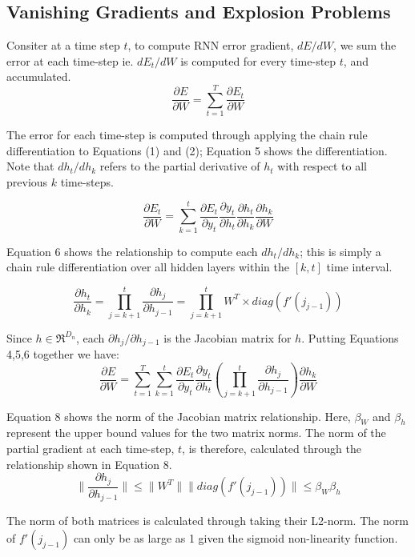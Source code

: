 \documentclass{article}
\begin{document}
\begin{appendices}
\section{Vanishing Gradients and Explosion Problems}
\label{sec:van}

	Consiter at a time step \(t\), to compute RNN error gradient, \(dE/dW\), we sum the error at each time-step ie. \(dE_t/dW\) is computed for every time-step \(t\), and accumulated.
	\[\frac{\partial E}{\partial W} = \sum_{t=1}^{T} \frac{\partial E_t}{\partial W} \tag{4}\]
	
	The error for each time-step is computed through applying the chain rule differentiation to Equations (1) and (2); Equation 5 shows the differentiation. Note that \(dh_t/dh_k\) refers to the partial derivative of \(h_t\) with respect to all previous \(k\) time-steps.
	
	\[
		\frac{\partial E_t}{\partial W} = \sum_{k=1}^{t} \frac{\partial E_t}{\partial y_t} \frac{\partial y_t}{\partial h_t} \frac{\partial h_t}{\partial h_k} \frac{\partial h_k}{\partial W}
		\tag{5}
	\]
	
	Equation 6 shows the relationship to compute each \(dh_t/dh_k\); this is simply a chain rule differentiation over all hidden layers within the \([k, t]\) time interval.
	
	\[
		\frac{\partial h_t}{\partial h_k} = \prod_{j=k+1}^{t} \frac{\partial h_j}{\partial h_{j-1}} = \prod_{j=k+1}^{t} W^T \times diag(f'(j_{j-1}))
		\tag{6}
	\]
	
	Since \(h \in \Re^{D_n} \), each \(\partial h_j/\partial h_{j-1} \) is the Jacobian matrix for \(h\). Putting Equations 4,5,6 together we have:
	\[
		\frac{\partial E}{\partial W} = \sum_{t=1}^{T} \sum_{k=1}^{t} \frac{\partial E_t}{\partial y_t} \frac{\partial y_t}{\partial h_t} (\prod_{j=k+1}^{t} \frac{\partial h_j}{\partial h_{j-1}}) \frac{\partial h_k}{\partial W}
		\tag{7}
	\]
	
	Equation 8 shows the norm of the Jacobian matrix relationship. Here, \(\beta_W\) and \(\beta_h\) represent the upper bound values for the two matrix norms. The norm of the partial gradient at each time-step, \(t\), is therefore, calculated through the relationship shown in Equation 8.
	\[
		\parallel \frac{\partial h_j}{\partial h_{j-1}} \parallel \leq \parallel W^T \parallel \parallel diag(f'(j_{j-1})) \parallel \leq \beta_W \beta_h
		\tag{8}
	\]
	
	The norm of both matrices is calculated through taking their L2-norm. The norm of \(f'(j_{j-1})\) can only be as large as 1 given the sigmoid non-linearity function.
	

\end{appendices}
\end{document}
